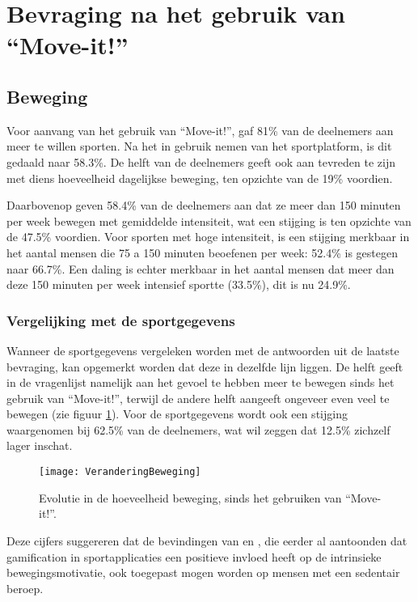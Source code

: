 \section{Bevraging na het gebruik van ``Move-it!''}

\subsection{Beweging}

Voor aanvang van het gebruik van ``Move-it!'', gaf 81\% van de deelnemers aan meer te willen sporten. Na het in gebruik nemen van het sportplatform, is dit gedaald naar 58.3\%.
De helft van de deelnemers geeft ook aan tevreden te zijn met diens hoeveelheid dagelijkse beweging, ten opzichte van de 19\% voordien.

Daarbovenop geven 58.4\% van de deelnemers aan dat ze meer dan 150 minuten per week bewegen met gemiddelde intensiteit, wat een stijging is ten opzichte van de 47.5\% voordien. Voor sporten met hoge intensiteit, is een stijging merkbaar in het aantal mensen die 75 a 150 minuten beoefenen per week: 52.4\% is gestegen naar 66.7\%. Een daling is echter merkbaar in het aantal mensen dat meer dan deze 150 minuten per week intensief sportte (33.5\%), dit is nu 24.9\%.

\subsubsection{Vergelijking met de sportgegevens}

Wanneer de sportgegevens vergeleken worden met de antwoorden uit de laatste bevraging, kan opgemerkt worden dat deze in dezelfde lijn liggen. De helft geeft in de vragenlijst namelijk aan het gevoel te hebben meer te bewegen sinds het gebruik van ``Move-it!'', terwijl de andere helft aangeeft ongeveer even veel te bewegen (zie figuur \ref{fig:evolutie_beweging}). Voor de sportgegevens wordt ook een stijging waargenomen bij 62.5\% van de deelnemers, wat wil zeggen dat 12.5\% zichzelf lager inschat.

\begin{figure}[h]
    \caption[Evolutie in de hoeveelheid beweging, sinds het gebruiken van ``Move-it!'']{Evolutie in de hoeveelheid beweging, sinds het gebruiken van ``Move-it!''.}
    \texttt{[image: VeranderingBeweging]}
    \label{fig:evolutie_beweging}
\end{figure}

Deze cijfers suggereren dat de bevindingen van \textcite{Kari2016} en \textcite{Bitrian2020}, die eerder al aantoonden dat gamification in sportapplicaties een positieve invloed heeft op de intrinsieke bewegingsmotivatie, ook toegepast mogen worden op mensen met een sedentair beroep.

